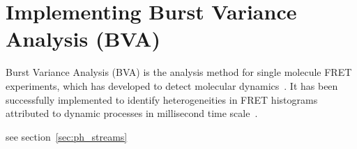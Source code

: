 \section{Implementing Burst Variance Analysis (BVA)}


Burst Variance Analysis (BVA) is the analysis method for single molecule FRET experiments, which has developed to detect molecular dynamics~\cite{Torella_2011}. It has been successfully implemented to identify heterogeneities in FRET histograms attributed to dynamic processes in millisecond time scale~\cite{Torella_2011, Robb_2013}.

see section~\ref{sec:ph_streams}